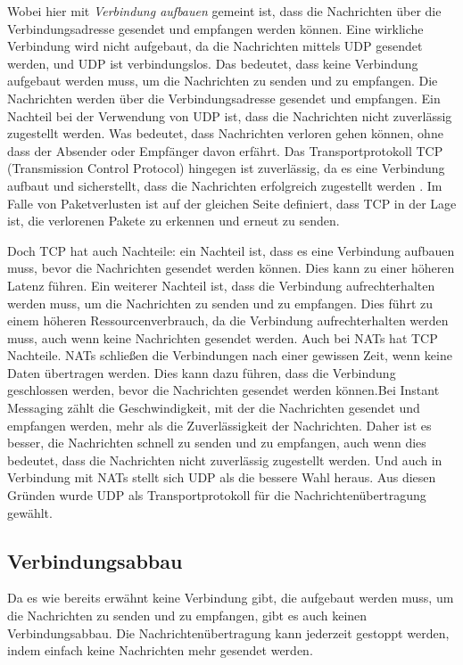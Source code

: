 Wobei hier mit \textit{Verbindung aufbauen} gemeint ist, dass die Nachrichten über die Verbindungsadresse gesendet und empfangen werden können. Eine wirkliche Verbindung wird nicht aufgebaut, da die Nachrichten mittels UDP gesendet werden, und UDP ist verbindungslos. Das bedeutet, dass keine Verbindung aufgebaut werden muss, um die Nachrichten zu senden und zu empfangen. Die Nachrichten werden über die Verbindungsadresse gesendet und empfangen. Ein Nachteil bei der Verwendung von UDP ist, dass die Nachrichten nicht zuverlässig zugestellt werden. Was bedeutet, dass Nachrichten verloren gehen können, ohne dass der Absender oder Empfänger davon erfährt. Das Transportprotokoll TCP (Transmission Control Protocol) hingegen ist zuverlässig, da es eine Verbindung aufbaut und sicherstellt, dass die Nachrichten erfolgreich zugestellt werden \parencite[S. 36]{rfc9293_TCP}. Im Falle von Paketverlusten ist auf der gleichen Seite definiert, dass TCP in der Lage ist, die verlorenen Pakete zu erkennen und erneut zu senden.

Doch TCP hat auch Nachteile: ein Nachteil ist, dass es eine Verbindung aufbauen muss, bevor die Nachrichten gesendet werden können. Dies kann zu einer höheren Latenz führen. Ein weiterer Nachteil ist, dass die Verbindung aufrechterhalten werden muss, um die Nachrichten zu senden und zu empfangen. Dies führt zu einem höheren Ressourcenverbrauch, da die Verbindung aufrechterhalten werden muss, auch wenn keine Nachrichten gesendet werden. Auch bei NATs hat TCP Nachteile. NATs schließen die Verbindungen nach einer gewissen Zeit, wenn keine Daten übertragen werden. Dies kann dazu führen, dass die Verbindung geschlossen werden, bevor die Nachrichten gesendet werden können.Bei Instant Messaging zählt die Geschwindigkeit, mit der die Nachrichten gesendet und empfangen werden, mehr als die Zuverlässigkeit der Nachrichten.
Daher ist es besser, die Nachrichten schnell zu senden und zu empfangen, auch wenn dies bedeutet, dass die Nachrichten nicht zuverlässig zugestellt werden. Und auch in Verbindung mit NATs stellt sich UDP als die bessere Wahl heraus. Aus diesen Gründen wurde UDP als Transportprotokoll für die Nachrichtenübertragung gewählt.


\subsection{Verbindungsabbau}

Da es wie bereits erwähnt keine Verbindung gibt, die aufgebaut werden muss, um die Nachrichten zu senden und zu empfangen, gibt es auch keinen Verbindungsabbau. Die Nachrichtenübertragung kann jederzeit gestoppt werden, indem einfach keine Nachrichten mehr gesendet werden. 

